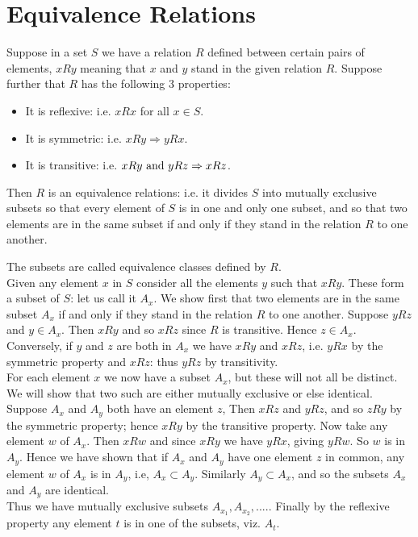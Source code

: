 \section{Equivalence Relations}
\begin{theorem}
Suppose in a set $S$ we have a relation $R$ defined between certain pairs of elements, $xRy$ meaning that $x$ and $y$ stand in the given relation $R$. 
Suppose further that $R$ has the following 3 properties:
\begin{itemize}
\item[(1)] It is reflexive: i.e. $xRx$ for all $x\in S$.
\item[(2)] It is symmetric: i.e. $xRy \Rightarrow yRx$.
\item[(3)] It is transitive: i.e. $xRy  \hbox{ and } yRz  \Rightarrow xRz$.
\end{itemize}
Then $R$ is an equivalence relations: i.e. it divides $S$ into mutually exclusive subsets so that every element of $S$ is in one and only one subset,
and so that two elements are in the same subset if and only if they stand in the relation $R$ to one another.
\end{theorem}
The subsets are called equivalence classes defined by $R$.\\

Given any element $x$ in $S$ consider all the elements $y$ such that $xRy$. These form a subset of $S$: let us call it $A_x$. We show first that two elements are in the same subset
$A_x$ if and only if they stand in the relation $R$ to one another. Suppose $yRz$ and $y\in A_x$. Then $xRy$ and so $xRz$ since $R$ is transitive. Hence $z\in A_x$. Conversely, if $y$ and
$z$ are both in $A_x$ we have $xRy$ and $xRz$, i.e. $yRx$ by the symmetric property and $xRz$: thus $yRz$ by transitivity.\\

For each element $x$ we now have a subset $A_x$, but these will not all be distinct. We will show that two such are either mutually exclusive or else identical. Suppose $A_x$ and $A_y$ both have an 
element $z$, Then $xRz$ and $yRz$, and so $zRy$ by the symmetric property; hence $xRy$ by the transitive property. Now take any element $w$ of $A_x$. Then $xRw$ and since $xRy$ we have $yRx$, giving
$yRw$. So $w$ is in $A_y$. Hence we have shown that if $A_x$ and $A_y$ have one element $z$ in common, any element $w$ of $A_x$ is in $A_y$, i.e, $A_x \subset A_y$. Similarly $A_y\subset A_x$, 
and so the subsets $A_x$ and $A_y$ are identical.\\

Thus we have mutually exclusive subsets $A_{x_1}, A_{x_2},....$. Finally by the reflexive property any element $t$ is in one of the subsets, viz. $A_t$.

